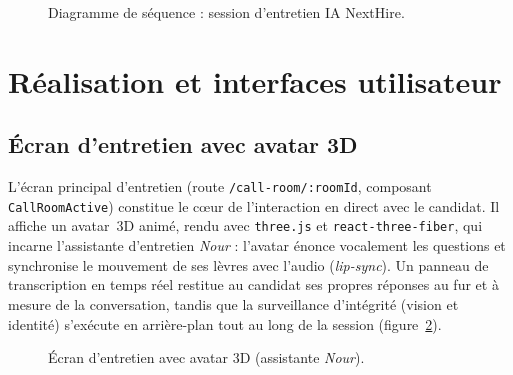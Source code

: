 \begin{figure}[H]
{%
  }
  \caption{Diagramme de séquence : session d'entretien IA NextHire.}
  \label{fig:seq-interview}
\end{figure}

\section{Réalisation et interfaces utilisateur}

\subsection{Écran d'entretien avec avatar 3D}

L'écran principal d'entretien (route \texttt{/call-room/:roomId}, composant
\texttt{CallRoomActive}) constitue le cœur de l'interaction en direct avec le candidat. Il
affiche un avatar~3D animé, rendu avec \texttt{three.js} et \texttt{react-three-fiber}, qui
incarne l'assistante d'entretien \textit{Nour} : l'avatar énonce vocalement les questions et
synchronise le mouvement de ses lèvres avec l'audio (\textit{lip-sync}). Un panneau de
transcription en temps réel restitue au candidat ses propres réponses au fur et à mesure de
la conversation, tandis que la surveillance d'intégrité (vision et identité) s'exécute en
arrière-plan tout au long de la session (figure~\ref{fig:interview-avatar}).

\begin{figure}[H]
  \centering
  \caption{Écran d'entretien avec avatar 3D (assistante \textit{Nour}).}
  \label{fig:interview-avatar}
\end{figure}

